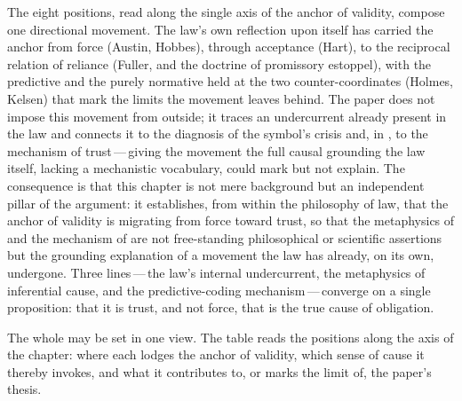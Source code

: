 The eight positions, read along the single axis of the anchor of validity, compose one directional movement. The law's own reflection upon itself has carried the anchor from force (Austin, Hobbes), through acceptance (Hart), to the reciprocal relation of reliance (Fuller, and the doctrine of promissory estoppel), with the predictive and the purely normative held at the two counter-coordinates (Holmes, Kelsen) that mark the limits the movement leaves behind. The paper does not impose this movement from outside; it traces an undercurrent already present in the law and connects it to the diagnosis of the symbol's crisis and, in , to the mechanism of trust\,---\,giving the movement the full causal grounding the law itself, lacking a mechanistic vocabulary, could mark but not explain. The consequence is that this chapter is not mere background but an independent pillar of the argument: it establishes, from within the philosophy of law, that the anchor of validity is migrating from force toward trust, so that the metaphysics of  and the mechanism of  are not free-standing philosophical or scientific assertions but the grounding explanation of a movement the law has already, on its own, undergone. Three lines\,---\,the law's internal undercurrent, the metaphysics of inferential cause, and the predictive-coding mechanism\,---\,converge on a single proposition: that it is trust, and not force, that is the true cause of obligation.

The whole may be set in one view. The table reads the positions along the axis of the chapter: where each lodges the anchor of validity, which sense of cause it thereby invokes, and what it contributes to, or marks the limit of, the paper's thesis.

